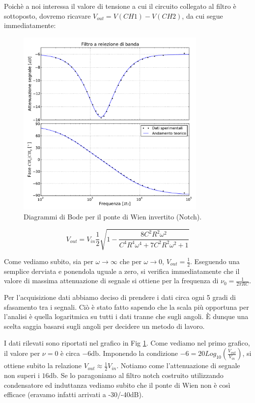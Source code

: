 Poichè a noi interessa il valore di tensione a cui il circuito collegato al filtro è sottoposto, dovremo ricavare $V_{out}=V(CH1)-V(CH2)$, da cui segue immediatamente:

\begin{figure}
	\centering
    \includegraphics[width=93mm]{notch.pdf}
    \caption{Diagrammi di Bode per il ponte di Wien invertito \phantom {trollolollo} (Notch).}
    \label{fig:notch}
\end{figure}

\begin{equation}
V_{out}=V_{in} \frac{1}{2} \sqrt{1-\frac{8 C^2 R^2 \omega^2}{C^4 R^4 \omega^4+7 C^2 R^2 \omega^2+1}}
\end{equation}


Come vediamo subito, sia per $\omega \rightarrow \infty$ che per $\omega \rightarrow 0$, $V_{out}=\frac{1}{2}$. Eseguendo una semplice derviata e ponendola uguale a zero, si verifica immediatamente che il valore di massima attenuazione di segnale si ottiene per la frequenza di $\nu_0=\frac{1}{2 \pi R C}$.

Per l'acquisizione dati abbiamo deciso di prendere i dati circa ogni 5 gradi di sfasamento tra i segnali. Ciò è stato fatto sapendo che la scala più opportuna per l'analisi è quella logaritmica su tutti i dati tranne che sugli angoli. \`E dunque una scelta saggia basarsi sugli angoli per decidere un metodo di lavoro.

I dati rilevati sono riportati nel grafico in Fig \ref{fig:notch}. Come vediamo nel primo grafico, il valore per $\nu=0$ è circa $-6 \si{\decibel}$. Imponendo la condizione $-6=20Log_{10}(\frac{V_{out}}{V_{in}})$, si ottiene subito la relazione $V_{out} \approx \frac{1}{2} V_{in}$. Notiamo come l'attenuazione di segnale non superi i $16 \si{\decibel}$. Se lo paragoniamo al filtro notch costruito utilizzando condensatore ed induttanza vediamo subito che il ponte di Wien non è così efficace (eravamo infatti arrivati a -30/-40dB).\\